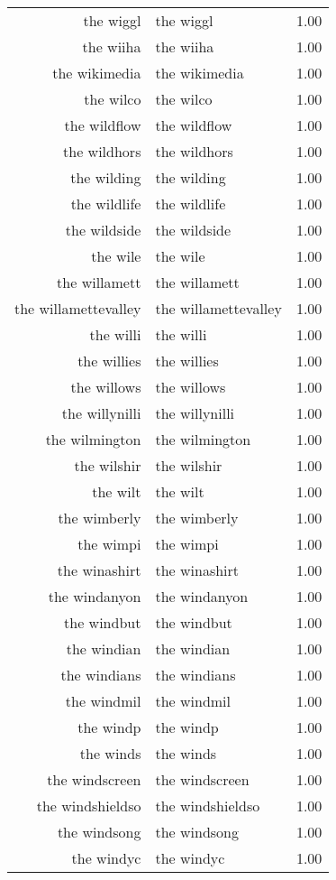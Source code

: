 \begin{table}[ht]
\begin{tabular}{rlr}
  the wiggl & the wiggl & 1.00 \\ 
  the wiiha & the wiiha & 1.00 \\ 
  the wikimedia & the wikimedia & 1.00 \\ 
  the wilco & the wilco & 1.00 \\ 
  the wildflow & the wildflow & 1.00 \\ 
  the wildhors & the wildhors & 1.00 \\ 
  the wilding & the wilding & 1.00 \\ 
  the wildlife & the wildlife & 1.00 \\ 
  the wildside & the wildside & 1.00 \\ 
  the wile & the wile & 1.00 \\ 
  the willamett & the willamett & 1.00 \\ 
  the willamettevalley & the willamettevalley & 1.00 \\ 
  the willi & the willi & 1.00 \\ 
  the willies & the willies & 1.00 \\ 
  the willows & the willows & 1.00 \\ 
  the willynilli & the willynilli & 1.00 \\ 
  the wilmington & the wilmington & 1.00 \\ 
  the wilshir & the wilshir & 1.00 \\ 
  the wilt & the wilt & 1.00 \\ 
  the wimberly & the wimberly & 1.00 \\ 
  the wimpi & the wimpi & 1.00 \\ 
  the winashirt & the winashirt & 1.00 \\ 
  the windanyon & the windanyon & 1.00 \\ 
  the windbut & the windbut & 1.00 \\ 
  the windian & the windian & 1.00 \\ 
  the windians & the windians & 1.00 \\ 
  the windmil & the windmil & 1.00 \\ 
  the windp & the windp & 1.00 \\ 
  the winds & the winds & 1.00 \\ 
  the windscreen & the windscreen & 1.00 \\ 
  the windshieldso & the windshieldso & 1.00 \\ 
  the windsong & the windsong & 1.00 \\ 
  the windyc & the windyc & 1.00 \\ 

\end{tabular}
\end{table}
